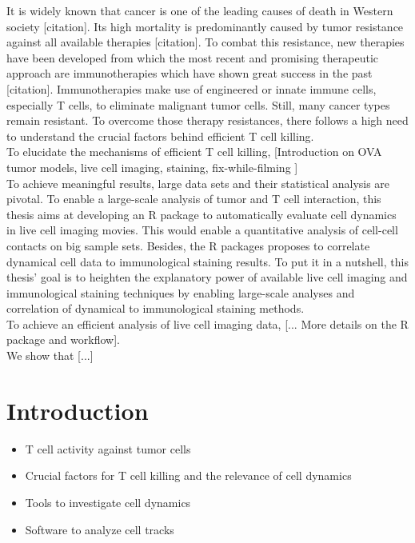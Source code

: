\documentclass{report}
\begin{document}
It is widely known that cancer is one of the leading causes of death in Western society [citation]. Its high mortality is predominantly caused by tumor resistance against all available therapies [citation]. To combat this resistance, new therapies have been developed from which the most recent and promising therapeutic approach are immunotherapies which have shown great success in the past [citation]. Immunotherapies make use of engineered or innate immune cells, especially T cells, to eliminate malignant tumor cells. Still, many cancer types remain resistant. To overcome those therapy resistances, there follows a high need to understand the crucial factors behind efficient T cell killing. \\

To elucidate the mechanisms of efficient T cell killing, [Introduction on OVA tumor models, live cell imaging, staining, fix-while-filming ]\\

To achieve meaningful results, large data sets and their statistical analysis are pivotal. To enable a large-scale analysis of tumor and T cell interaction, this thesis aims at developing an R package to automatically evaluate cell dynamics in live cell imaging movies. This would enable a quantitative analysis of cell-cell contacts on big sample sets. Besides, the R packages proposes to correlate dynamical cell data to immunological staining results. To put it in a nutshell, this thesis' goal is to heighten the explanatory power of available live cell imaging and immunological staining techniques by enabling large-scale analyses and correlation of dynamical to immunological staining methods.\\

To achieve an efficient analysis of live cell imaging data, [... More details on the R package and workflow]. \\

We show that [...]

\chapter{Introduction}

\begin{itemize}
	\item T cell activity against tumor cells
	\item Crucial factors for T cell killing and the relevance of cell dynamics
	\item Tools to investigate cell dynamics
	\item Software to analyze cell tracks
\end{itemize}
\end{document}
